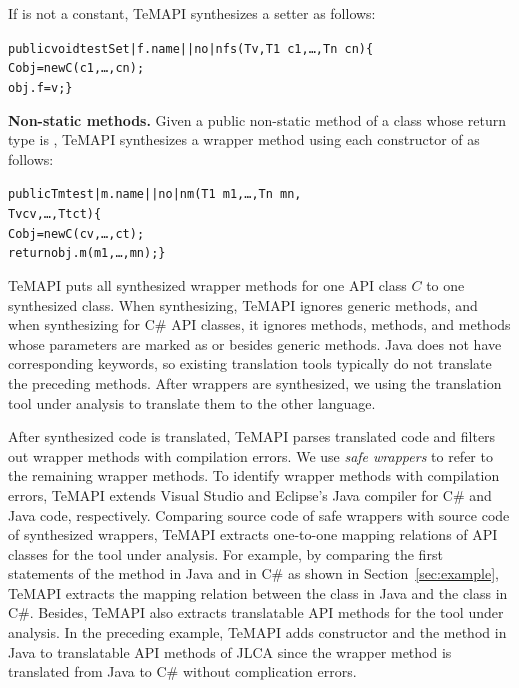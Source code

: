 If  is not a constant, TeMAPI synthesizes a setter as follows:

\begin{CodeOut}\vspace*{-1.5ex}
\begin{alltt}
 public void testSet|f.name||no|nfs(T v, T1\ c1,\ldots, Tn\ cn)\{
   C obj = new C(c1,\ldots, cn);
   obj.f = v; \}
\end{alltt}
\end{CodeOut}\vspace*{-1.5ex}

\textbf{Non-static methods.} Given a public non-static method  of a class  whose return type is , TeMAPI synthesizes a wrapper method using each constructor  of  as follows:

\begin{CodeOut}\vspace*{-1.5ex}
\begin{alltt}
 public Tm test|m.name||no|nm(T1\ m1,\ldots, Tn\ mn,
                            Tv cv, \ldots, Tt ct)\{
   C obj = new C(cv,\ldots, ct);
   return obj.m(m1,\ldots, mn); \}
\end{alltt}
\end{CodeOut}\vspace*{-1.5ex}


TeMAPI puts all synthesized wrapper methods for one API class $C$ to one synthesized class. When synthesizing, TeMAPI ignores generic methods, and when synthesizing for C\# API classes, it ignores  methods,  methods, and methods whose parameters are marked as  or  besides generic methods. Java does not have corresponding keywords, so existing translation tools typically do not translate the preceding methods. After wrappers are synthesized, we using the translation tool under analysis to translate them to the other language.

After synthesized code is translated, TeMAPI parses translated code and filters out wrapper methods with compilation errors. We use \emph{safe wrappers} to refer to the remaining wrapper methods. To identify wrapper methods with compilation errors, TeMAPI extends Visual Studio and Eclipse's Java compiler for C\# and Java code, respectively. Comparing source code of safe wrappers with source code of synthesized wrappers, TeMAPI extracts one-to-one mapping relations of API classes for the tool under analysis. For example, by comparing the first statements of the  method in Java and in C\# as shown in Section~\ref{sec:example}, TeMAPI extracts the mapping relation between the  class in Java and the  class in C\#. Besides, TeMAPI also extracts translatable API methods for the tool under analysis. In the preceding example, TeMAPI adds  constructor and the  method in Java to translatable API methods of JLCA since the wrapper method is translated from Java to C\# without complication errors.


